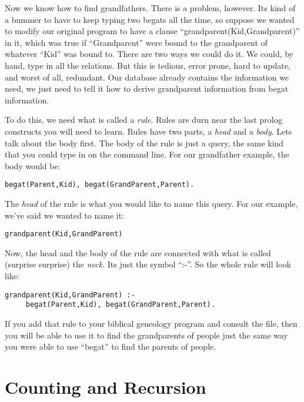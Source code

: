 \documentclass{book}[9pt]
\begin{document}
Now we know how to find grandfathers.  There is a problem, however.
Its kind of a bummer to have to keep typing two begats all the time,
so suppose we wanted to modify our original program to have a clause
``grandparent(Kid,Grandparent)'' in it, which was true if
``Grandparent'' were bound to the grandparent of whatever ``Kid'' was
bound to.  There are two ways we could do it.  We could, by hand, type
in all the relations.  But this is tedious, error prone, hard to
update, and worst of all, redundant.  Our database already contains
the information we need, we just need to tell it how to derive
grandparent information from begat information.

To do this, we need what is called a {\em rule}.  Rules are durn near
the last prolog constructs you will need to learn.  Rules have two
parts, a {\em head} and a {\em body}.  Lets talk about the body first.
The body of the rule is just a query, the same kind that you could type
in on the command line.  For our grandfather example, the body would be:
\begin{verbatim}
begat(Parent,Kid), begat(GrandParent,Parent). 
\end{verbatim}
\noindent  The {\em head} of the rule is what you would like to name this query. 
For our example, we've said we wanted to name it: 
\begin{verbatim}
grandparent(Kid,GrandParent)
\end{verbatim}
\noindent  Now, the head and the body of the rule are connected with what is
called (surprise surprise) the {\em neck}.  Its just the symbol ``:-''.  So the
whole rule will look like:
\begin{verbatim}
grandparent(Kid,GrandParent) :- 
     begat(Parent,Kid), begat(GrandParent,Parent). 
\end{verbatim}
\noindent If you add that rule to your biblical geneology program and
consult the file, then you will be able to use it to find the grandparents
of people just the same way you were able to use ``begat'' to find the parents
of people.

\section{Counting and Recursion}
\end{document}
